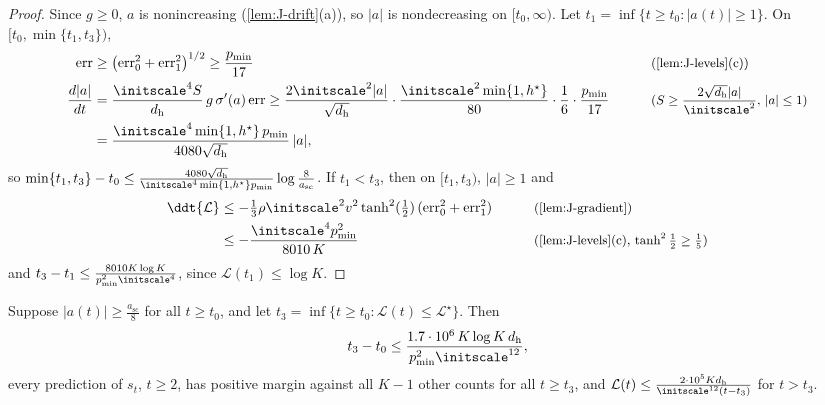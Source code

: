 \begin{proof}
Since $g\ge0$, $a$ is nonincreasing (\cref{lem:J-drift}(a)), so $|a|$ is nondecreasing on $[t_0,\infty)$. Let $t_1=\inf\{t\ge t_0:|a(t)|\ge1\}$. On
$[t_0,\min\{t_1,t_3\})$,
\begin{alignat*}{2}
 \mathrm{err}&\ge\bigl(\mathrm{err}_0^2+\mathrm{err}_1^2\bigr)^{1/2}\ge\frac{p_{\min}}{17} &\qquad& \why{\cref{lem:J-levels}(c)}\\
 \frac{d|a|}{dt}&=\frac{\initscale^4S}{d_{\mathrm h}}\,g\,\sigma'(a)\,\mathrm{err}\ge\frac{2\initscale^2|a|}{\sqrt{d_{\mathrm h}}}\cdot\frac{\initscale^2\min\{1,h^\star\}}{80}\cdot\frac{1}{6}\cdot\frac{p_{\min}}{17} && \why{$S\ge\frac{2\sqrt{d_{\mathrm h}}|a|}{\initscale^2}$, $|a|\le1$}\\
 &=\frac{\initscale^4\min\{1,h^\star\}\,p_{\min}}{4080\sqrt{d_{\mathrm h}}}\,|a|,
\end{alignat*}
so $\min\{t_1,t_3\}-t_0\le\frac{4080\sqrt{d_{\mathrm h}}}{\initscale^4\min\{1,h^\star\}p_{\min}}\log\frac{8}{a_{\mathrm{sc}}}$. If $t_1<t_3$, then on $[t_1,t_3)$, $|a|\ge1$ and
\begin{alignat*}{2}
 \ddt{\mathcal L}&\le-\tfrac{1}{3}\rho\initscale^2v^2\tanh^2(\tfrac{1}{2})\,(\mathrm{err}_0^2+\mathrm{err}_1^2) &\qquad& \why{\cref{lem:J-gradient}}\\
 &\le-\frac{\initscale^4p_{\min}^2}{8010\,K} && \why{\cref{lem:J-levels}(c), $\tanh^2\tfrac{1}{2}\ge\tfrac{1}{5}$}
\end{alignat*}
and $t_3-t_1\le\frac{8010K\log K}{p_{\min}^2\initscale^4}$, since $\mathcal L(t_1)\le\log K$.
\end{proof}

\begin{lemma}[Descent]
\label{lem:J-descent}
Suppose $|a(t)|\ge\frac{a_{\mathrm{sc}}}{8}$ for all $t\ge t_0$, and let $t_3=\inf\{t\ge t_0:\mathcal L(t)\le \mathcal L^\star\}$. Then
\[
 t_3-t_0\le\frac{1.7\cdot10^6\,K\log K\,d_{\mathrm h}}{p_{\min}^2\initscale^{12}},
\]
every prediction of $s_t$, $t\ge2$, has positive margin against all $K-1$ other counts for all $t\ge t_3$, and
$\mathcal L(t)\le\frac{2\cdot10^5Kd_{\mathrm h}}{\initscale^{12}(t-t_3)}$ for $t>t_3$.
\end{lemma}

